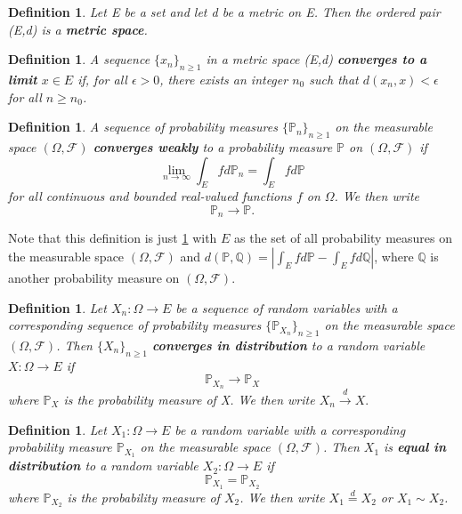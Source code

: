 \documentclass[honours,12pt]{UNSWthesis}
\newcommand{\PP}{\mathbb{P}}
\newcommand{\1}{\mathbf 1}
\newcommand{\FF}{\mathcal{F}}
\newtheorem{definition}[theorem]{Definition}
\numberwithin{equation}{section}
\theoremstyle{definition}
\theoremstyle{remark}
\begin{document}
\begin{definition}
Let E be a set and let d be a metric on E. Then the ordered pair (E,d) is a \textbf{metric space}.\\
\end{definition}

\begin{definition}\label{def:metricConvergence}
A sequence $\{x_n\}_{n\geq1}$ in a metric space (E,d) \textbf{converges to a limit} $x\in E$ if, for all $\epsilon>0$, there exists an integer $n_0$ such that $d(x_n,x)<\epsilon$ for all $n\geq n_0$.\\
\end{definition}

\begin{definition}
A sequence of probability measures $\{\PP_n\}_{n \geq 1}$ on the measurable space $(\Omega, \FF)$ \textbf{converges weakly} to a probability measure $\PP$ on $(\Omega, \FF)$ if
\[
\lim_{n\rightarrow \infty} \int_E fd\PP_n = \int_Efd\PP
\]
for all continuous and bounded real-valued functions $f$ on $\Omega$. We then write \[\PP_n\rightarrow\PP.\]
\end{definition}
\noindent Note that this definition is just \ref{def:metricConvergence} with $E$ as the set of all probability measures on the measurable space $(\Omega, \FF)$ and $d(\PP,\mathbb{Q})=|\int_Efd\PP- \int_Efd\mathbb{Q}|$, where $\mathbb{Q}$ is another probability measure on $(\Omega, \FF).$\\

\begin{definition}
Let $X_n:\Omega\to E$ be a sequence of random variables with a corresponding sequence of probability measures $\{\PP_{X_n}\}_{n\geq 1}$ on the measurable space $(\Omega, \FF)$. Then $\{X_n\}_{n\geq 1}$ \textbf{converges in distribution} to a random variable $X:\Omega\to E$ if 
\[\PP_{X_n} \to \PP_X \] where $\PP_X$ is the probability measure of X. We then write $X_n \overset{d}{\to}X.$\\
\end{definition}

\begin{definition}\label{def:equalDist}
Let $X_1:\Omega\to E$ be a  random variable with a corresponding probability measure $\PP_{X_1}$ on the measurable space $(\Omega, \FF)$. Then $X_1$ is \textbf{equal in distribution} to a random variable $X_2:\Omega\to E$ if 
\[\PP_{X_1} = \PP_{X_2} \] where $\PP_{X_2}$ is the probability measure of $X_2$. We then write $X_1 \overset{d}{=}X_2$ or $X_1 \sim X_2$.\\
\end{definition}
\end{document}
